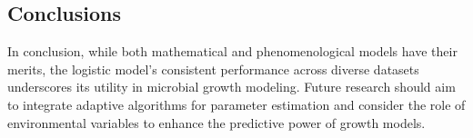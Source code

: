 \documentclass[11pt]{article}
\begin{document}
\subsection{Conclusions}
In conclusion, while both mathematical and phenomenological models have their merits, the logistic model's consistent performance across diverse datasets underscores its utility in microbial growth modeling. Future research should aim to integrate adaptive algorithms for parameter estimation and consider the role of environmental variables to enhance the predictive power of growth models.



\newpage  

 

\end{document}
